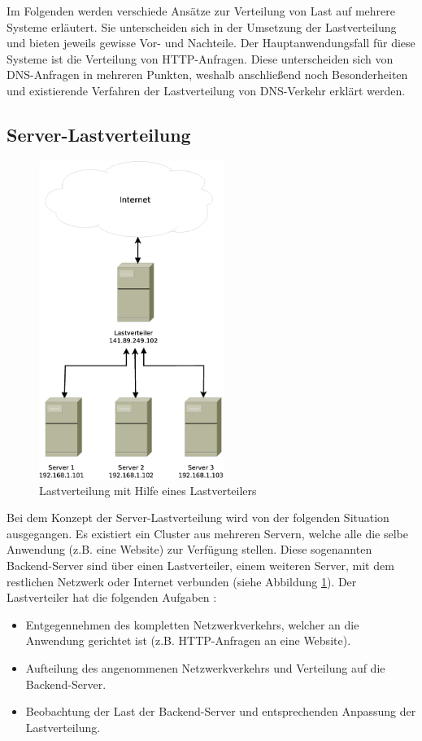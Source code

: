 \documentclass[a4paper, 12pt, BCOR10mm, DIV12, toc=bibliography, toc=listof, german]{scrbook}
\begin{document}
		Im Folgenden werden verschiede Ansätze zur Verteilung von Last auf mehrere Systeme erläutert.
		Sie unterscheiden sich in der Umsetzung der Lastverteilung und bieten jeweils gewisse Vor- und
		Nachteile. Der Hauptanwendungsfall für diese Systeme ist die Verteilung von HTTP-Anfragen.
		Diese unterscheiden sich von DNS-Anfragen in mehreren Punkten, weshalb anschließend noch
		Besonderheiten und existierende Verfahren der Lastverteilung von DNS-Verkehr erklärt werden.

			\subsection*{Server-Lastverteilung} %

			\begin{figure}
				\centering
				\includegraphics[width=6cm]{images/loadbalancer}
				\caption{Lastverteilung mit Hilfe eines Lastverteilers}
				\label{fig:loadbalancer}
			\end{figure}
			

			Bei dem Konzept der Server-Lastverteilung wird von der folgenden Situation ausgegangen.  Es
			existiert ein Cluster aus mehreren Servern, welche alle die selbe Anwendung (z.B. eine
			Website) zur Verfügung stellen. Diese sogenannten Backend-Server sind über einen
			Lastverteiler, einem weiteren Server, mit dem restlichen Netzwerk oder Internet verbunden
			(siehe Abbildung \ref{fig:loadbalancer}). Der Lastverteiler hat die folgenden Aufgaben
			\cite{bourke2001}:

			\begin{itemize}
				\item Entgegennehmen des kompletten Netzwerkverkehrs, welcher an die Anwendung gerichtet ist
					(z.B. HTTP-Anfragen an eine Website).
				\item Aufteilung des angenommenen Netzwerkverkehrs und Verteilung auf die Backend-Server.
				\item Beobachtung der Last der Backend-Server und entsprechenden Anpassung der
					Lastverteilung.
			\end{itemize}
\end{document}
